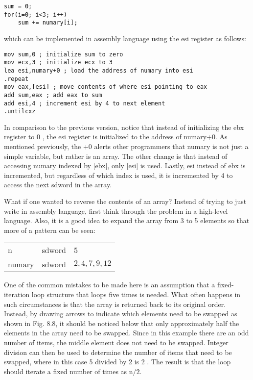 \documentclass[10pt]{article}
\begin{document}
\begin{verbatim}
sum = 0;
for(i=0; i<3; i++)
    sum += numary[i];
\end{verbatim}

which can be implemented in assembly language using the esi register as follows:

\begin{verbatim}
mov sum,0 ; initialize sum to zero
mov ecx,3 ; initialize ecx to 3
lea esi,numary+0 ; load the address of numary into esi
.repeat
mov eax,[esi] ; move contents of where esi pointing to eax
add sum,eax ; add eax to sum
add esi,4 ; increment esi by 4 to next element
.untilcxz
\end{verbatim}

In comparison to the previous version, notice that instead of initializing the ebx register to 0 , the esi register is initialized to the address of numary+0. As mentioned previously, the +0 alerts other programmers that numary is not just a simple variable, but rather is an array. The other change is that instead of accessing numary indexed by [ebx], only [esi] is used. Lastly, esi instead of ebx is incremented, but regardless of which index is used, it is incremented by 4 to access the next sdword in the array.

What if one wanted to reverse the contents of an array? Instead of trying to just write in assembly language, first think through the problem in a high-level language. Also, it is a good idea to expand the array from 3 to 5 elements so that more of a pattern can be seen:

\begin{center}
\begin{tabular}{lll}
n & sdword & 5 \\
numary & sdword & $2,4,7,9,12$ \\
\end{tabular}
\end{center}

One of the common mistakes to be made here is an assumption that a fixed-iteration loop structure that loops five times is needed. What often happens in such circumstances is that the array is returned back to its original order. Instead, by drawing arrows to indicate which elements need to be swapped as shown in Fig. 8.8, it should be noticed below that only approximately half the elements in the array need to be swapped. Since in this example there are an odd number of items, the middle element does not need to be swapped. Integer division can then be used to determine the number of items that need to be swapped, where in this case 5 divided by 2 is 2 . The result is that the loop should iterate a fixed number of times as $\mathrm{n} / 2$.
\end{document}
